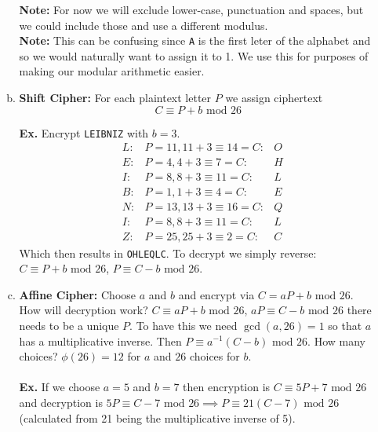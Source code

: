 \documentclass[class=article, crop=false]{standalone}
\begin{document}
\begin{enumerate}
\begin{enumerate}[(a)]
		\textbf{Note:} For now we will exclude lower-case, punctuation and spaces, but we could include those
		and use a different modulus.\\
		\textbf{Note:} This can be confusing since \verb|A| is the first leter of the alphabet and so we would
		naturally want to assign it to 1. We use this for purposes of making our modular arithmetic easier.

		\item \textbf{Shift Cipher:} For each plaintext letter $P$ we assign ciphertext
		$$C \equiv P+ b \mbox{ mod } 26$$

		\textbf{Ex.} Encrypt \verb|LEIBNIZ| with $b=3$.
		\begin{align*}
			&L: &P=11, 11+3\equiv14=C: &O \\
			&E: &P=4, 4+3\equiv7=C: &H \\
			&I: &P=8, 8+3\equiv11=C: &L \\
			&B: &P=1, 1+3\equiv4=C: &E \\
			&N: &P=13, 13+3\equiv16=C: &Q \\
			&I: &P=8, 8+3\equiv11=C: &L \\
			&Z: &P=25, 25+3\equiv2=C: &C
		\end{align*}
		Which then results in \verb|OHLEQLC|.
		To decrypt we simply reverse: $C\equiv P+b\mbox{ mod }26$, $P\equiv C-b\mbox{ mod }26$.

		\item \textbf{Affine Cipher:} Choose $a$ and $b$ and encrypt via $C=aP + b \mbox{ mod }26$.
		How will decryption work? $C\equiv aP + b \mbox{ mod }26$, $aP\equiv C-b\mbox{ mod }26$
		there needs to be a unique $P$.
		To have this we need $\gcd(a, 26)=1$ so that $a$ has a multiplicative inverse.
		Then $P\equiv a^{-1} (C-b)\mbox{ mod }26$.
		How many choices? $\phi(26)=12$ for $a$ and $26$ choices for $b$.\\\\
		\textbf{Ex.} If we choose $a=5$ and $b=7$ then encryption is $C\equiv 5P + 7 \mbox{ mod }26$
		and decryption is $5P \equiv C-7\mbox{ mod }26 \implies P\equiv 21(C-7)\mbox{ mod }26$
		(calculated from 21 being the multiplicative inverse of 5).
	\end{enumerate}
\end{enumerate}

\end{document}
